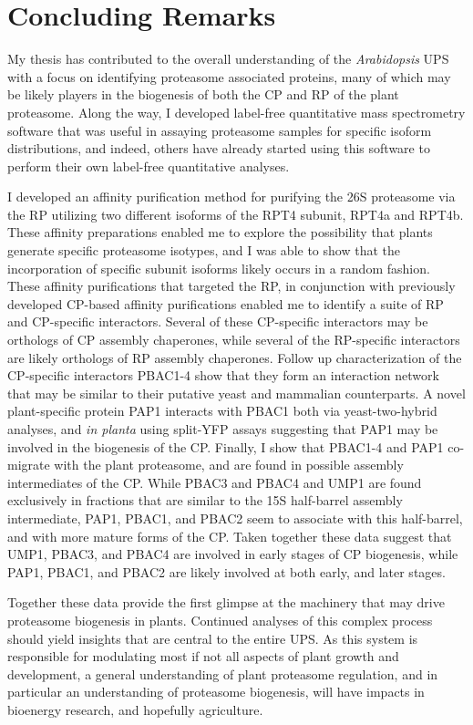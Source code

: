 \FloatBarrier
\section{Concluding Remarks}
	My thesis has contributed to the overall understanding of the \textit{Arabidopsis} UPS with a focus on identifying proteasome associated proteins, many of which may be likely players in the biogenesis of both the CP and RP of the plant proteasome. Along the way, I developed label-free quantitative mass spectrometry software that was useful in assaying proteasome samples for specific isoform distributions, and indeed, others have already started using this software to perform their own label-free quantitative analyses.
	 
	I developed an affinity purification method for purifying the 26S proteasome via the RP utilizing two different isoforms of the RPT4 subunit, RPT4a and RPT4b. These affinity preparations enabled me to explore the possibility that plants generate specific proteasome isotypes, and I was able to show that the incorporation of specific subunit isoforms likely occurs in a random fashion. These affinity purifications that targeted the RP, in conjunction with previously developed CP-based affinity purifications enabled me to identify a suite of RP and CP-specific interactors. Several of these CP-specific interactors may be orthologs of CP assembly chaperones, while several of the RP-specific interactors are likely orthologs of RP assembly chaperones. Follow up characterization of the CP-specific interactors PBAC1-4 show that they form an interaction network that may be similar to their putative yeast and mammalian counterparts. A novel plant-specific protein PAP1 interacts with PBAC1 both via yeast-two-hybrid analyses, and \textit{in planta} using split-YFP assays suggesting that PAP1 may be involved in the biogenesis of the CP. Finally, I show that PBAC1-4 and PAP1 co-migrate with the plant proteasome, and are found in possible assembly intermediates of the CP. While PBAC3 and PBAC4 and UMP1 are found exclusively in fractions that are similar to the 15S half-barrel assembly intermediate, PAP1, PBAC1, and PBAC2 seem to associate with this half-barrel, and with more mature forms of the CP. Taken together these data suggest that UMP1, PBAC3, and PBAC4 are involved in early stages of CP biogenesis, while PAP1, PBAC1, and PBAC2 are likely involved at both early, and later stages. 
	
	Together these data provide the first glimpse at the machinery that may drive proteasome biogenesis in plants. Continued analyses of this complex process should yield insights that are central to the entire UPS. As this system is responsible for modulating most if not all aspects of plant growth and development, a general understanding of plant proteasome regulation, and in particular an understanding of proteasome biogenesis, will have impacts in bioenergy research, and hopefully agriculture.

